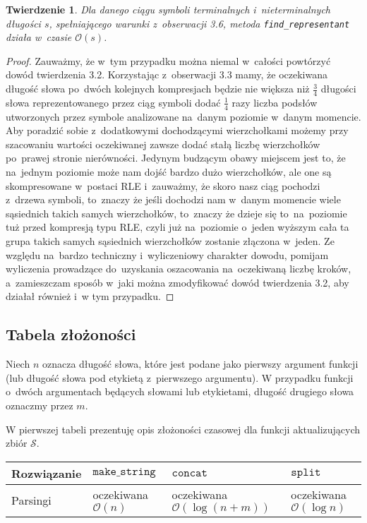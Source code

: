 \documentclass[declaration,shortabstract]{iithesis}
\theoremstyle{definition} \newtheorem{definition}{Definicja}[chapter]
\theoremstyle{plain} \newtheorem{remark}[definition]{Obserwacja}
\theoremstyle{plain} \newtheorem{theorem}[definition]{Twierdzenie}
\theoremstyle{plain} \newtheorem{example}{Przykład}[definition]
\theoremstyle{plain} \newtheorem{lemma}[definition]{Lemat}
\begin{document}
\begin{theorem}
    Dla danego ciągu symboli terminalnych i~nieterminalnych długości $s$, spełniającego warunki z~obserwacji 3.6, metoda \texttt{find\_representant} działa w~czasie $\mathcal{O}(s)$.
\end{theorem}

\begin{proof}
    Zauważmy, że w~tym przypadku można niemal w~całości powtórzyć dowód twierdzenia 3.2. Korzystając z~obserwacji 3.3 mamy, że oczekiwana długość słowa po~dwóch kolejnych kompresjach będzie nie większa niż $\frac{3}{4}$ długości słowa reprezentowanego przez ciąg symboli dodać $\frac{1}{4}$ razy liczba podsłów utworzonych przez symbole analizowane na~danym poziomie w~danym momencie. Aby poradzić sobie z~dodatkowymi dochodzącymi wierzchołkami możemy przy szacowaniu wartości oczekiwanej zawsze dodać stałą liczbę wierzchołków po~prawej stronie nierówności. Jedynym budzącym obawy miejscem jest to, że na~jednym poziomie może nam dojść bardzo dużo wierzchołków, ale one są skompresowane w~postaci RLE i~zauważmy, że skoro nasz ciąg pochodzi z~drzewa symboli, to~znaczy że jeśli dochodzi nam w~danym momencie wiele sąsiednich takich samych wierzchołków, to~znaczy że dzieje się to~na~poziomie tuż przed kompresją typu RLE, czyli już na~poziomie o~jeden wyższym cała ta grupa takich samych sąsiednich wierzchołków zostanie złączona w~jeden. Ze względu na~bardzo techniczny i~wyliczeniowy charakter dowodu, pomijam wyliczenia prowadzące do~uzyskania oszacowania na~oczekiwaną liczbę kroków, a~zamieszczam sposób w~jaki można zmodyfikować dowód twierdzenia 3.2, aby działał również i~w tym przypadku.
\end{proof}

\subsection{Tabela złożoności}

Niech $n$ oznacza długość słowa, które jest podane jako pierwszy argument funkcji (lub długość słowa pod etykietą z~pierwszego argumentu). W przypadku funkcji o~dwóch argumentach będących słowami lub etykietami, długość drugiego słowa oznaczmy przez $m$.

W pierwszej tabeli prezentuję opis złożoności czasowej dla funkcji aktualizujących zbiór $\mathcal{S}$.

\begin{center}
    \begin{tabular}{ | m{3cm} | >{\centering\arraybackslash}m{3cm} | >{\centering\arraybackslash}m{3cm} | >{\centering\arraybackslash}m{3cm} | }
        \hline 
        Rozwiązanie & $\texttt{make\_string}$ & $\texttt{concat}$ & $\texttt{split}$ \\
        \hline
        Parsingi & oczekiwana $\mathcal{O}(n)$ & oczekiwana $\mathcal{O}(\log(n + m))$ & oczekiwana $\mathcal{O}(\log n)$ \\
        \hline
    \end{tabular}
\end{center}
\end{document}
